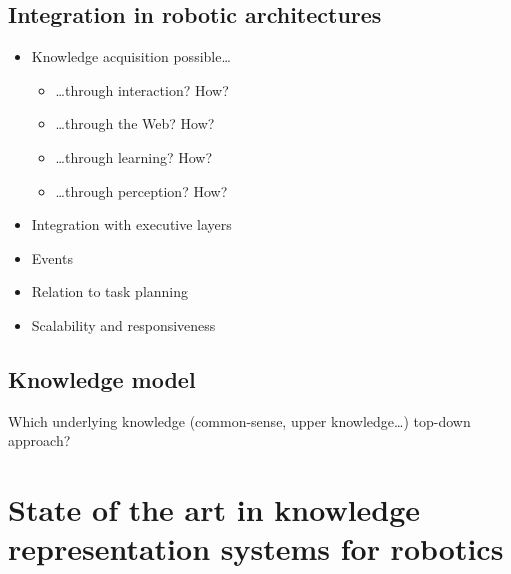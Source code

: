 \subsection{Integration in robotic architectures}
\label{sect|eval-integration-robotic-archi}

\begin{itemize}
	\item Knowledge acquisition possible…
	\begin{itemize}
		\item …through interaction? How?
		\item …through the Web? How?
		\item …through learning? How?
		\item …through perception? How?
	\end{itemize}

	\item Integration with executive layers
	\item Events
	\item Relation to task planning
	\item Scalability and responsiveness
\end{itemize}

\subsection{Knowledge model}
\label{sect|eval-knowledge-model}

Which underlying knowledge (common-sense, upper knowledge…)
top-down approach?

\section{State of the art in knowledge representation systems for robotics}
\label{sect|krs-survey}



